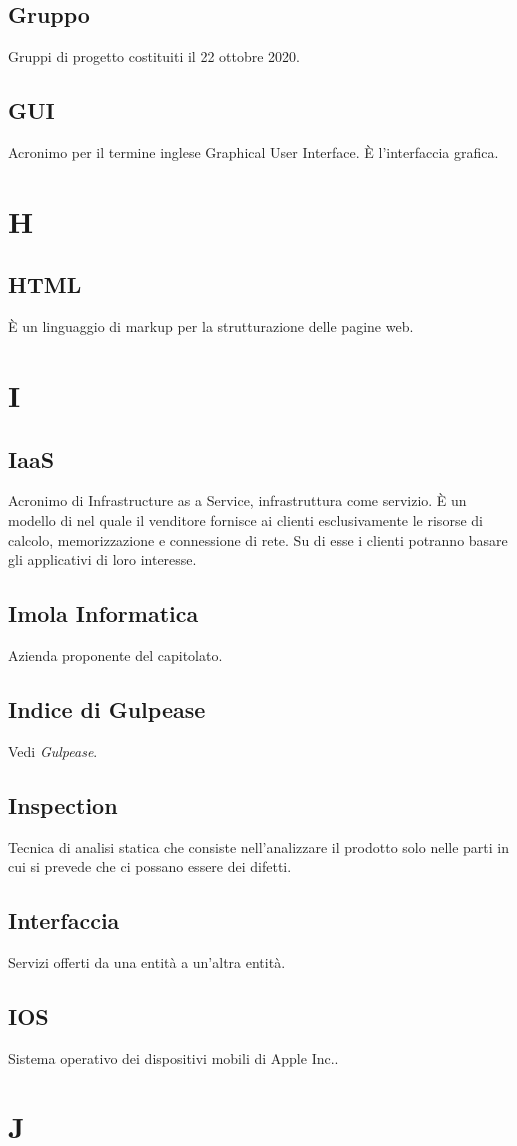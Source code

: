 \subsection{Gruppo} Gruppi di progetto costituiti il 22 ottobre 2020.
\subsection{GUI} Acronimo per il termine inglese Graphical User Interface. È l'interfaccia grafica.
\newpage \section{H}
\subsection{HTML} È un linguaggio di markup per la strutturazione delle pagine web.
\newpage \section{I}
\subsection{IaaS} Acronimo di Infrastructure as a Service, infrastruttura come servizio. È un modello di  nel quale il venditore fornisce ai clienti esclusivamente le risorse di calcolo, memorizzazione e connessione di rete. Su di esse i clienti potranno basare gli applicativi di loro interesse.
\subsection{Imola Informatica} Azienda proponente del capitolato.
\subsection{Indice di Gulpease} Vedi \textit{Gulpease}.
\subsection{Inspection} Tecnica di analisi statica che consiste nell’analizzare il prodotto solo nelle parti in cui si prevede che ci possano essere dei difetti.
\subsection{Interfaccia} Servizi offerti da una entità a un'altra entità.
\subsection{IOS} Sistema operativo dei dispositivi mobili di Apple Inc..
\newpage \section{J}
